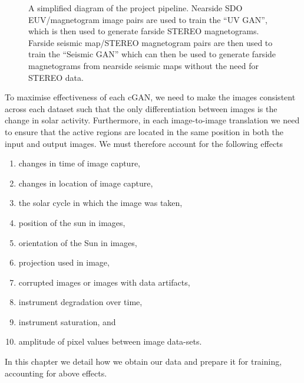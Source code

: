 \documentclass[11pt,a4paper,onecolumn]{report}
\begin{document}
\begin{figure}
  \caption{A simplified diagram of the project pipeline. Nearside SDO
  EUV/magnetogram image pairs are used to train the ``UV GAN'', which is then
  used to generate farside STEREO magnetograms. Farside seismic map/STEREO
  magnetogram pairs are then used to train the ``Seismic GAN'' which can then be
  used to generate farside magnetograms from nearside seismic maps without the
  need for STEREO data.}
  \label{fig:simple_diagram}
\end{figure}
To maximise effectiveness of each cGAN, we need to make the images consistent
across each dataset such that the only differentiation between images is the
change in solar activity. Furthermore, in each image-to-image translation we
need to ensure that the active regions are located in the same position in both the
input and output images. We must therefore account for the following effects
\begin{enumerate}[i]
  \item changes in time of image capture, 
  \item changes in location of image capture,
  \item the solar cycle in which the image was taken,
  \item position of the sun in images,
  \item orientation of the Sun in images,
  \item projection used in image,
  \item corrupted images or images with data artifacts,
  \item instrument degradation over time,
  \item instrument saturation, and
  \item amplitude of pixel values between image data-sets.
\end{enumerate}
In this chapter we detail how we obtain our data and prepare it for training,
accounting for above effects.
\end{document}
